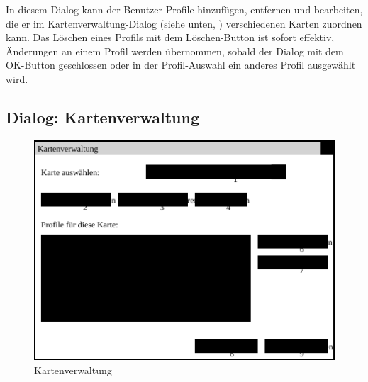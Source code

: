 \documentclass[a4paper, 11pt]{article}
\begin{document}
In diesem Dialog kann der Benutzer Profile hinzufügen, entfernen und bearbeiten, die er im Kartenverwaltung-Dialog (siehe unten, ) verschiedenen Karten zuordnen kann. Das Löschen eines Profils mit dem Löschen-Button ist sofort effektiv, Änderungen an einem Profil werden übernommen, sobald der Dialog mit dem OK-Button geschlossen oder in der Profil-Auswahl ein anderes Profil ausgewählt wird.

\subsection{Dialog: Kartenverwaltung}
\begin{figure}[H]
\centering
\includegraphics[width=0.7\linewidth]{Kartenverwaltung}
\caption{Kartenverwaltung}
\label{fig:mockupkartenverwaltung}
\end{figure}
\end{document}
